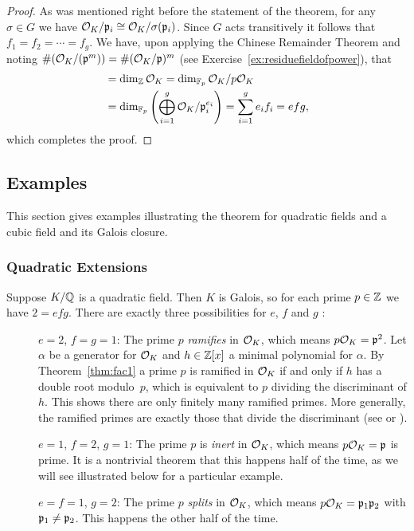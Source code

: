 \begin{proof}
	As was mentioned right before the statement of the theorem,
	for any $\sigma\in G$ we have $\mathcal{O}_K/\mathfrak{p}_i\cong \mathcal{O}_K/\sigma(\mathfrak{p}_i)$.
	Since $G$ acts transitively it follows that $f_1=f_2=\cdots = f_g$.
	We have, upon applying the Chinese Remainder Theorem
	and noting $\#(\mathcal{O}_K/(\mathfrak{p}^m)) = \#(\mathcal{O}_K/\mathfrak{p})^m$
	(see Exercise~\ref{ex:residuefieldofpower}), that
	\begin{align*}
		[K:\Q]&= \dim_{\Z} \O_K = \dim_{\F_p} \O_K/p\O_K \\
		&= \dim_{\F_p} \left(\bigoplus_{i=1}^g \O_K/\p_i^{e_i}\right)
		= \sum_{i=1}^g e_i f_i
		= efg,
	\end{align*}
	which completes the proof.
\end{proof}

\subsection{Examples}

This section gives examples illustrating the theorem for quadratic fields
and a cubic field and its Galois closure.

\subsubsection{Quadratic Extensions}

Suppose $K/\mathbb{Q}$ is a quadratic field. 
Then $K$ is Galois, so for each prime $p\in\mathbb{Z}$ we have $2 = efg$.
There are exactly three possibilities for $e$, $f$ and $g$ :
\begin{description}
	\item[] $e=2$, $f=g=1$: The prime $p$ \emph{ramifies} in
	$\mathcal{O}_K$, which means $p\mathcal{O}_K = \mathfrak{p}^2$.  Let $\alpha$ be a generator for $\mathcal{O}_K$ and
	$h\in\mathbb{Z}[x]$ a minimal polynomial for $\alpha$.
	By Theorem~\ref{thm:fac1} a prime $p$ is ramified in $\mathcal{O}_K$ if and only if
	$h$ has a double root modulo~$p$, which is equivalent to $p$ dividing
	the discriminant of $h$. This shows there are only finitely many ramified
	primes. More generally, the ramified primes are exactly those
	that divide the discriminant (see \cite[Thm.~24]{marcus1977number}
	or \cite[Cor.~III.2.12]{neukirch1999}).

	\item[] $e=1$, $f=2$, $g=1$: The prime $p$ is \emph{inert} in $\mathcal{O}_K$,
	which means $p\mathcal{O}_K = \mathfrak{p}$ is prime.  It is a nontrivial theorem that
	this happens half of the time,
	as we will see illustrated below for a particular example.

	\item[] $e=f=1$, $g=2$: The prime $p$ \emph{splits} in $\mathcal{O}_K$,
	which means $p\mathcal{O}_K = \mathfrak{p}_1\mathfrak{p}_2$ with $\mathfrak{p}_1\neq \mathfrak{p}_2$.  This happens the other
	half of the time.
\end{description}

